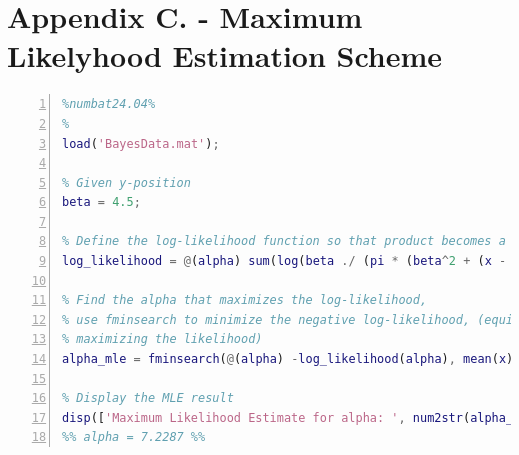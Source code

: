 \documentclass[a4paper,11pt]{article}
\begin{document}
\section{Appendix C. - Maximum Likelyhood Estimation Scheme}
\begin{lstlisting}[language=Matlab,
                   numbers=left,
                   basicstyle=\small,
                   stepnumber=1,
                   numbersep=10pt,
                   tabsize=2,
                   showspaces=false,
                   showstringspaces=false]
%%%%%%%%%Estimating alpha using Maximum Likelyhood Solution%%%%%%%%%%%%
%numbat24.04%
%
load('BayesData.mat');

% Given y-position
beta = 4.5;

% Define the log-likelihood function so that product becomes a sum
log_likelihood = @(alpha) sum(log(beta ./ (pi * (beta^2 + (x - alpha).^2))));

% Find the alpha that maximizes the log-likelihood, 
% use fminsearch to minimize the negative log-likelihood, (equivalent to
% maximizing the likelihood)
alpha_mle = fminsearch(@(alpha) -log_likelihood(alpha), mean(x));

% Display the MLE result
disp(['Maximum Likelihood Estimate for alpha: ', num2str(alpha_mle)]);
%% alpha = 7.2287 %%
\end{lstlisting}
\end{document}
